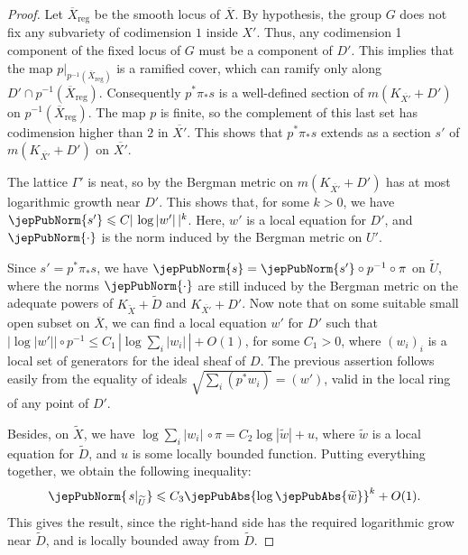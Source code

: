 \begin{proof}


Let $\overline{X}_{\mathrm{reg}}$ be the smooth locus of $\overline{X}$. By hypothesis, the group $G$ does not fix any subvariety of codimension $1$ inside $X'$. Thus, any codimension 1 component of the fixed locus of $G$ must be a component of $D'$. This implies that the map $p|_{p^{-1} (\overline{X}_{\mathrm{reg}})}$ is a ramified cover, which can ramify only along $D'\cap  p^{-1}(\overline{X}_{\mathrm{reg}})$. Consequently $p^\ast \pi_\ast s$ is a well-defined section of $m( K_{\overline{X'}} + D')$ on $p^{-1}(\overline{X}_{\mathrm{reg}})$. The map $p$ is finite, so the complement of this last set has codimension higher than $2$ in $\overline{X'}$. This shows that $p^\ast \pi_\ast s$ extends as a section $s'$ of $m( K_{\overline{X'}} + D')$ on $\overline{X'}$.

The lattice $\Gamma'$ is neat, so by \cite{pubref23} the Bergman metric on $m(K_{\overline{X'}} + D')$ has at most logarithmic growth near $D'$. This shows that, for some $k > 0$, we have $\jepPubNorm{s'} \leqslant C |\, \log |w'| \,| ^k$. Here, $w'$ is a local equation for $D'$, and $\jepPubNorm{\cdot}$ is the norm induced by the Bergman metric on $U'$. 

Since $s' = p^\ast \pi_\ast s$, we have $\jepPubNorm{s} = \jepPubNorm{s'} \circ p^{-1} \circ \pi$ on $\widetilde{U}$, where the norms $\jepPubNorm{\cdot}$ are still induced by the Bergman metric on the adequate powers of $K_{\widetilde{X}} + \widetilde{D}$ and $K_{\overline{X'}} + D'$. Now note that on some suitable small open subset on $\overline{X}$, we can find a local equation $w'$ for $D'$ such that $\left| \log |w'| \right| \circ p^{-1} \leqslant C_1 \,   \left| \log \sum_i |w_i|  \, \right| + O(1)$, for some $C_1 > 0$, where $(w_i)_i$ is a local set of generators for the ideal sheaf of $D$. The previous assertion follows easily from the equality of ideals $\sqrt{\sum_i \left( p^\ast w_i \right)} = \left( w' \right)$, valid in the local ring of any point of $D'$.

Besides, on $\widetilde{X}$, we have $ \log \sum_i |w_i| \,  \circ \pi = C_2 \log |\widetilde{w}| + u$, where $\widetilde{w}$ is a local equation for $\widetilde{D}$, and $u$ is some locally bounded function. Putting everything together, we obtain the following inequality:
$$
\jepPubNorm{ \left. s \right|_{\widetilde{U}} } \leqslant C_3 \jepPubAbs{ \log \jepPubAbs{\widetilde{w}}}^k + O(1).
$$
This gives the result, since the right-hand side has the required logarithmic grow near $\widetilde{D}$, and is locally bounded away from $\widetilde{D}$.
\end{proof}

